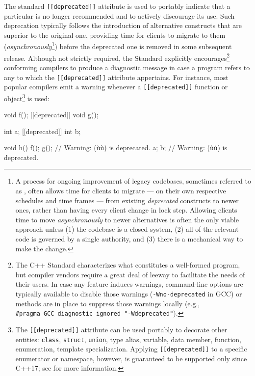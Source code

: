 The standard \lstinline![[deprecated]]! attribute is used to portably
indicate that a particular  is no longer recommended and
to actively discourage its use. Such deprecation typically follows the
introduction of alternative constructs that are
superior to the original one, providing time for clients to migrate to
them (\emph{asynchronously}{\cprotect\footnote{A process for ongoing
improvement of legacy codebases, sometimes referred to as
, often allows time for clients to
migrate --- on their own respective schedules and time frames --- from
existing \emph{deprecated} constructs to newer ones, rather than
having every client change in lock step. Allowing clients time to move
\emph{asynchronously} to newer alternatives is often the only viable
approach unless (1) the codebase is a closed system, (2) all of the
relevant code is governed by a single authority, and (3) there is a mechanical way to make the change.}}) before the deprecated
one is removed in some subsequent release. Although not strictly
required, the Standard explicitly encourages{\cprotect\footnote{The C++
Standard characterizes what constitutes a well-formed program, but
compiler vendors require a great deal of leeway to facilitate the
needs of their users. In case any feature induces warnings,
command-line options are typically available to disable those warnings
(\lstinline!-Wno-deprecated! in GCC) or methods are in place to suppress those warnings
locally (e.g.,
  \lstinline!#pragma!~\lstinline!GCC!~\lstinline!diagnostic!~\lstinline!ignored!~\lstinline!"-Wdeprecated"!).}}
conforming compilers to produce a diagnostic message in case a program
refers to any  to which the \lstinline![[deprecated]]!
attribute appertains. For instance, most popular compilers emit a
warning whenever a \lstinline![[deprecated]]! function or
object{\cprotect\footnote{The \lstinline![[deprecated]]! attribute can be
used portably to decorate other entities: \lstinline!class!,
\lstinline!struct!, \lstinline!union!, type alias, variable, data member,
function, enumeration, template specialization. Applying
\lstinline![[deprecated]]! to a specific enumerator or namespace,
however, is guaranteed to be supported only since C++17; see
  \cite{smith15a} for more information.}} is used:

\begin{emcppslisting}[language=C++]
               void f();
[[deprecated]] void g();

               int a;
[[deprecated]] int b;

void h()
{
    f();
    g();  // Warning: (ù{}ù) is deprecated.
    a;
    b;    // Warning: (ù{}ù) is deprecated.
}
\end{emcppslisting}
    
